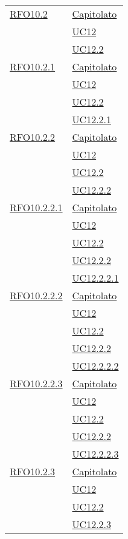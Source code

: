 \begin{longtable}{|>{\centering}m{5cm}|m{5cm}<{\centering}|}
 \hyperlink{RFO10.2}{RFO10.2} & \hyperlink{Capitolato}{Capitolato}\\
& \hyperref[UC12]{UC12}\\
& \hyperref[UC12.2]{UC12.2}\\\hline

 \hyperlink{RFO10.2.1}{RFO10.2.1} & \hyperlink{Capitolato}{Capitolato}\\
& \hyperref[UC12]{UC12}\\
& \hyperref[UC12.2]{UC12.2}\\
& \hyperref[UC12.2.1]{UC12.2.1}\\\hline

 \hyperlink{RFO10.2.2}{RFO10.2.2} & \hyperlink{Capitolato}{Capitolato}\\
& \hyperref[UC12]{UC12}\\
& \hyperref[UC12.2]{UC12.2}\\
& \hyperref[UC12.2.2]{UC12.2.2}\\\hline

 \hyperlink{RFO10.2.2.1}{RFO10.2.2.1} & \hyperlink{Capitolato}{Capitolato}\\
& \hyperref[UC12]{UC12}\\
& \hyperref[UC12.2]{UC12.2}\\
& \hyperref[UC12.2.2]{UC12.2.2}\\
& \hyperref[UC12.2.2.1]{UC12.2.2.1}\\\hline

 \hyperlink{RFO10.2.2.2}{RFO10.2.2.2} & \hyperlink{Capitolato}{Capitolato}\\
& \hyperref[UC12]{UC12}\\
& \hyperref[UC12.2]{UC12.2}\\
& \hyperref[UC12.2.2]{UC12.2.2}\\
& \hyperref[UC12.2.2.2]{UC12.2.2.2}\\\hline

 \hyperlink{RFO10.2.2.3}{RFO10.2.2.3} & \hyperlink{Capitolato}{Capitolato}\\
& \hyperref[UC12]{UC12}\\
& \hyperref[UC12.2]{UC12.2}\\
& \hyperref[UC12.2.2]{UC12.2.2}\\
& \hyperref[UC12.2.2.3]{UC12.2.2.3}\\\hline

 \hyperlink{RFO10.2.3}{RFO10.2.3} & \hyperlink{Capitolato}{Capitolato}\\
& \hyperref[UC12]{UC12}\\
& \hyperref[UC12.2]{UC12.2}\\
& \hyperref[UC12.2.3]{UC12.2.3}\\\hline


\end{longtable}
